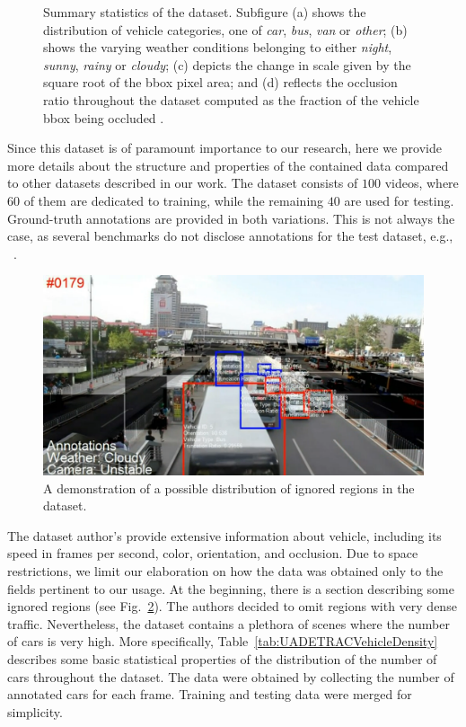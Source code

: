 \begin{figure}[t]
\begin{subfigure}[b]{\uadetracfigsize\textwidth}
        \caption[]{}
    \end{subfigure}
    \caption[\uadetrac{} dataset overview]{Summary statistics of the \uadetrac{} dataset. Subfigure (a) shows the distribution of vehicle categories, one of \emph{car}, \emph{bus}, \emph{van} or \emph{other}; (b) shows the varying weather conditions belonging to either \emph{night}, \emph{sunny}, \emph{rainy} or \emph{cloudy}; (c) depicts the change in scale given by the square root of the \gls{bbox} pixel area; and (d) reflects the occlusion ratio throughout the dataset computed as the fraction of the vehicle \gls{bbox} being occluded . }
    \label{fig:UADETRACStats}
\end{figure}

Since this dataset is of paramount importance to our research, here we provide more details about the structure and properties of the contained data compared to other datasets described in our work. The dataset consists of $100$ videos, where $60$ of them are dedicated to training, while the remaining $40$ are used for testing. Ground-truth annotations are provided in both variations. This is not always the case, as several benchmarks do not disclose annotations for the test dataset, e.g., ~\cite{geiger2012cvpr}.

\begin{figure}[t]
    \centerline{\includegraphics[width=0.8\linewidth]{figures/datasets/uadetrac_ignored_regions.png}}
    \caption[Ignored regions in \uadetrac{}]{A demonstration of a possible distribution of ignored regions in the \uadetrac{} dataset. }
    \label{fig:UADETRACIgnoredRegions}
\end{figure}

The dataset author's provide extensive information about vehicle, including its speed in frames per second, color, orientation, and occlusion. Due to space restrictions, we limit our elaboration on how the data was obtained only to the fields pertinent to our usage. At the beginning, there is a section describing some ignored regions (see Fig.~\ref{fig:UADETRACIgnoredRegions}). The authors decided to omit regions with very dense traffic. Nevertheless, the dataset contains a plethora of scenes where the number of cars is very high. More specifically, Table~\ref{tab:UADETRACVehicleDensity} describes some basic statistical properties of the distribution of the number of cars throughout the dataset. The data were obtained by collecting the number of annotated cars for each frame. Training and testing data were merged for simplicity.


